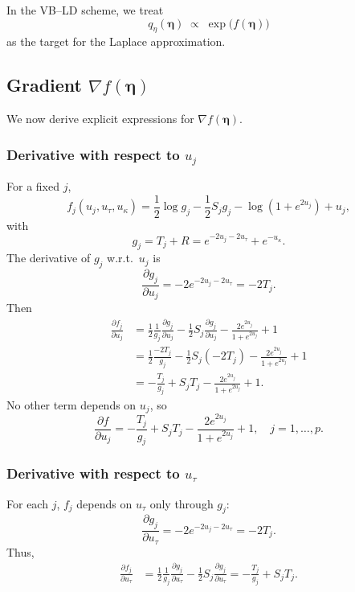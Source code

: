 \documentclass[11pt]{article}
\newcommand{\vect}[1]{\boldsymbol{#1}}
\begin{document}
In the VB--LD scheme, we treat
\begin{equation}
  q_\eta(\vect{\eta}) \;\propto\; \exp\big(f(\vect{\eta})\big)
\end{equation}
as the target for the Laplace approximation.

\subsection{Gradient $\nabla f(\boldsymbol{\eta})$}

We now derive explicit expressions for $\nabla f(\vect{\eta})$.

\subsubsection*{Derivative with respect to $u_j$}

For a fixed $j$,
\[
  f_j(u_j,u_\tau,u_\kappa)
  = \frac12 \log g_j
  - \frac12 S_j g_j
  - \log(1+e^{2u_j})
  + u_j,
\]
with
\[
  g_j = T_j + R = e^{-2u_j-2u_\tau} + e^{-u_\kappa}.
\]
The derivative of $g_j$ w.r.t.\ $u_j$ is
\[
  \frac{\partial g_j}{\partial u_j}
  = -2 e^{-2u_j-2u_\tau}
  = -2 T_j.
\]
Then
\begin{align}
  \frac{\partial f_j}{\partial u_j}
  &= \frac12 \frac{1}{g_j}\frac{\partial g_j}{\partial u_j}
     - \frac12 S_j \frac{\partial g_j}{\partial u_j}
     - \frac{2 e^{2u_j}}{1+e^{2u_j}}
     + 1 \\
  &= \frac12 \frac{-2T_j}{g_j}
     - \frac12 S_j(-2T_j)
     - \frac{2 e^{2u_j}}{1+e^{2u_j}}
     + 1 \\
  &= -\frac{T_j}{g_j} + S_j T_j
     - \frac{2 e^{2u_j}}{1+e^{2u_j}} + 1.
\end{align}
No other term depends on $u_j$, so
\begin{equation}
  \boxed{
  \frac{\partial f}{\partial u_j}
  = -\frac{T_j}{g_j} + S_j T_j
    - \frac{2 e^{2u_j}}{1+e^{2u_j}} + 1,
  \quad j=1,\dots,p.
  }
\end{equation}

\subsubsection*{Derivative with respect to $u_\tau$}

For each $j$, $f_j$ depends on $u_\tau$ only through $g_j$:
\[
  \frac{\partial g_j}{\partial u_\tau}
  = -2 e^{-2u_j-2u_\tau}
  = -2T_j.
\]
Thus,
\begin{align}
  \frac{\partial f_j}{\partial u_\tau}
  &= \frac12 \frac{1}{g_j}\frac{\partial g_j}{\partial u_\tau}
     - \frac12 S_j \frac{\partial g_j}{\partial u_\tau}
  = -\frac{T_j}{g_j} + S_j T_j.
\end{align}
\end{document}
